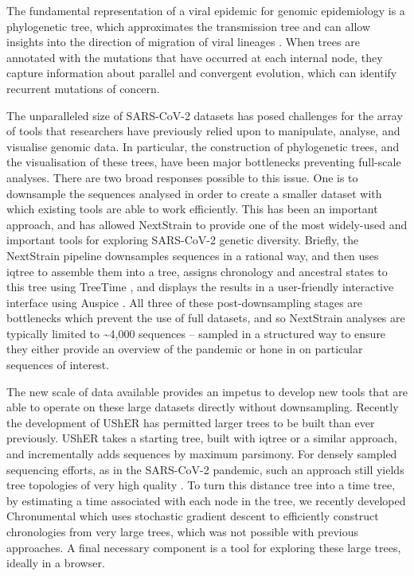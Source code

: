 The fundamental representation of a viral epidemic for genomic epidemiology is a phylogenetic tree, which approximates the transmission tree and can allow insights into the direction of migration of viral lineages \citep{pmid27501264}. When trees are annotated with the mutations that have occurred at each internal node, they capture information about parallel and convergent evolution, which can identify recurrent mutations of concern.

The unparalleled size of SARS-CoV-2 datasets has posed challenges for the array of tools that researchers have previously relied upon to manipulate, analyse, and visualise genomic data. In particular, the construction of phylogenetic trees, and the visualisation of these trees, have been major bottlenecks preventing full-scale analyses. There are two broad responses possible to this issue. One is to downsample the sequences analysed in order to create a smaller dataset with which existing tools are able to work efficiently. This has been an important approach, and has allowed NextStrain \citep{nextstrain} to provide one of the most widely-used and important tools for exploring SARS-CoV-2 genetic diversity. Briefly, the NextStrain pipeline downsamples sequences in a rational way, and then uses iqtree \citep{iqtree} to assemble them into a tree, assigns chronology and ancestral states to this tree using TreeTime \citep{treetime}, and displays the results in a user-friendly interactive interface using Auspice \citep{nextstrain}. All three of these post-downsampling stages are bottlenecks which prevent the use of full datasets, and so NextStrain analyses are typically limited to \textasciitilde4,000 sequences -- sampled in a structured way to ensure they either provide an overview of the pandemic or hone in on particular sequences of interest.


The new scale of data available provides an impetus to develop new tools that are able to operate on these large datasets directly without downsampling. Recently the development of UShER \citep{usher} has permitted larger trees to be built than ever previously. UShER takes a starting tree, built with iqtree or a similar approach, and incrementally adds sequences by maximum parsimony. For densely sampled sequencing efforts, as in the SARS-CoV-2 pandemic, such an approach still yields tree topologies of very high quality \citep{Thornlow2021.12.02.471004}. To turn this distance tree into a time tree, by estimating a time associated with each node in the tree, we recently developed Chronumental \citep{chronumental} which uses stochastic gradient descent to efficiently construct chronologies from very large trees, which was not possible with previous approaches. A final necessary component is a tool for exploring these large trees, ideally in a browser.

